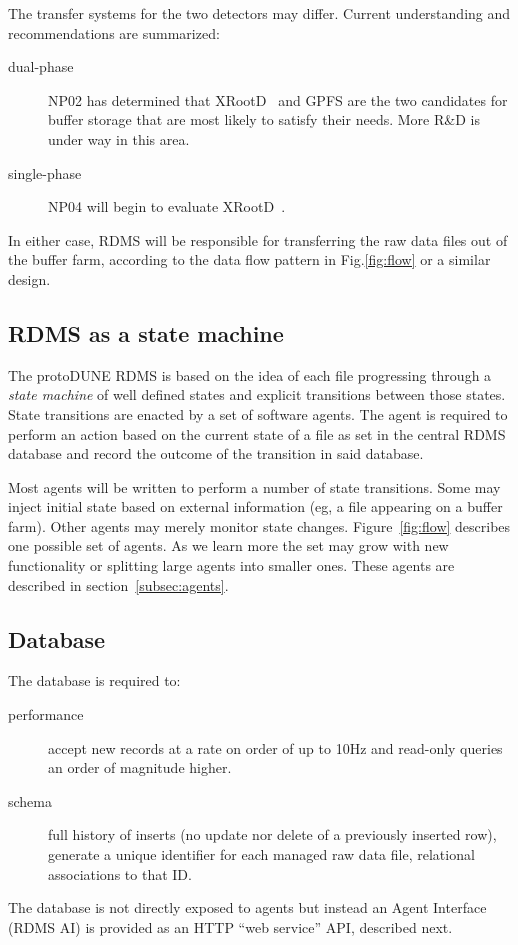 \documentclass[pdftex,12pt,letter]{article}
\begin{document}
\noindent The transfer systems for the two detectors may differ.  Current
understanding and recommendations are summarized:

\begin{description}
\item[dual-phase] NP02 has determined that XRootD~\cite{xrootd} and GPFS are the two candidates for buffer storage
that are most likely to satisfy their needs. More R\&D is under way in this area.

\item[single-phase] NP04 will begin to evaluate XRootD~\cite{xrootd}.
\end{description}

\noindent In either case, RDMS will be responsible for transferring the raw data files out of the buffer farm,
according to the data flow pattern in Fig.\ref{fig:flow} or a similar design.

\subsection{RDMS as a state machine}

The protoDUNE RDMS is based on the idea of each file progressing
through a \textit{state machine} of well defined states and explicit
transitions between those states.  State transitions are enacted by a
set of software agents.  The agent is required to perform an action
based on the current state of a file as set in the central RDMS
database and record the outcome of the transition in said database.

Most agents will be written to perform a number of state transitions.
Some may inject initial state based on external information (eg, a
file appearing on a buffer farm).  Other agents may merely monitor state
changes.  Figure~\ref{fig:flow} describes one possible set of agents.
As we learn more the set may grow with new functionality or splitting
large agents into smaller ones.  These agents are described in
section~\ref{subsec:agents}.

\subsection{Database}

The database is required to:
\begin{description}
\item[performance] accept new records at a rate on order of up to 10Hz and   read-only queries an order of magnitude higher.

\item[schema] full history of inserts (no update nor delete of a  previously inserted row), generate a unique identifier for each managed
  raw data file, relational associations to that ID.
\end{description}
The database is not directly exposed to agents but instead an Agent Interface (RDMS AI) is provided as an HTTP ``web service'' API, described next.
\end{document}
